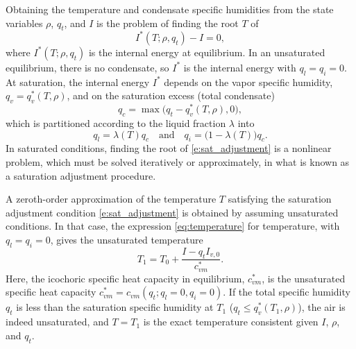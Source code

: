 \documentclass{report}
\begin{document}
Obtaining the temperature and condensate specific humidities from the state variables $\rho$, $q_t$, and $I$ is the problem of finding the root $T$ of
\begin{equation}\label{e:sat_adjustment}
I^*(T; \rho, q_t) - I = 0,
\end{equation}
where $I^*(T; \rho, q_t)$ is the internal energy at equilibrium. In an unsaturated equilibrium, there is no condensate, so $I^*$ is the internal energy with $q_l=q_i=0$. At saturation, the internal energy $I^*$ depends on the vapor specific humidity, $q_v = q_v^*(T, \rho)$, and on the saturation excess (total condensate) 
\begin{equation}
q_c = \max\bigl(q_t - q_v^*(T, \rho), 0\bigr), 
\end{equation}
which is partitioned according to the liquid fraction $\lambda$ into 
\begin{equation}\label{e:phase_partition}
q_l = \lambda(T) q_c \quad \text{and} \quad q_i = \bigl(1-\lambda(T)\bigr)q_c.
\end{equation} 
In saturated conditions, finding the root of \eqref{e:sat_adjustment} is a nonlinear problem, which must be solved iteratively or approximately, in what is known as a saturation adjustment procedure. 

A zeroth-order approximation of the temperature $T$ satisfying the saturation adjustment condition \eqref{e:sat_adjustment} is obtained by assuming unsaturated conditions. In that case, the expression \eqref{eq:temperature} for temperature, with $q_l=q_i=0$, gives the unsaturated temperature 
\begin{equation}
    T_1 = T_0 + \frac{I - q_t I_{v,0}}{c_{vm}^*}.
\end{equation}
Here, the icochoric specific heat capacity in equilibrium, $c_{vm}^*$, is the unsaturated specific heat capacity $c_{vm}^* = c_{vm}(q_t; q_l=0, q_i=0)$. If the total specific humidity $q_t$ is less than the saturation specific humidity at $T_1$ ($q_t \le q_v^*(T_1, \rho)$), the air is indeed unsaturated, and $T=T_1$ is the exact temperature consistent given $I$, $\rho$, and $q_t$. 
\end{document}
